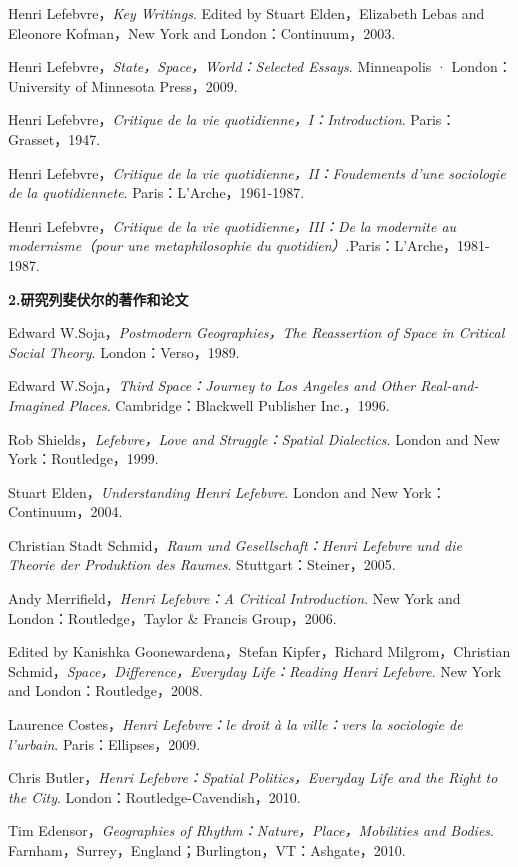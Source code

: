 \documentclass[UTF8, fontset = sourcesans, a4paper, oneside, zihao =
-4, scheme=chinese, no-math, space=true]{ctexbook}
\begin{document}
Henri Lefebvre，\emph{Key Writings}. Edited by Stuart Elden，Elizabeth
Lebas and Eleonore Kofman，New York and London：Continuum，2003.

Henri Lefebvre，\emph{State，Space，World：Selected Essays}. Minneapolis
· London：University of Minnesota Press，2009.

Henri Lefebvre，\emph{Critique de la vie quotidienne，I：Introduction}.
Paris：Grasset，1947.

Henri Lefebvre，\emph{Critique de la vie quotidienne，II：Foudements
d'une sociologie de la quotidiennete}. Paris：L'Arche，1961-1987.

Henri Lefebvre，\emph{Critique de la vie quotidienne，III：De la
modernite au modernisme（pour une metaphilosophie du
quotidien）}.Paris：L'Arche，1981-1987.

\textbf{2.研究列斐伏尔的著作和论文}

Edward W.Soja，\emph{Postmodern Geographies，The Reassertion of Space in
Critical Social Theory}. London：Verso，1989.

Edward W.Soja，\emph{Third Space：Journey to Los Angeles and Other
Real-and-Imagined Places}. Cambridge：Blackwell Publisher Inc.，1996.

Rob Shields，\emph{Lefebvre，Love and Struggle：Spatial Dialectics}.
London and New York：Routledge，1999.

Stuart Elden，\emph{Understanding Henri Lefebvre}. London and New
York：Continuum，2004.

Christian Stadt Schmid，\emph{Raum und Gesellschaft：Henri Lefebvre und
die Theorie der Produktion des Raumes}. Stuttgart：Steiner，2005.

Andy Merrifield，\emph{Henri Lefebvre：A Critical Introduction}. New
York and London：Routledge，Taylor \& Francis Group，2006.

Edited by Kanishka Goonewardena，Stefan Kipfer，Richard
Milgrom，Christian Schmid，\emph{Space，Difference，Everyday
Life：Reading Henri Lefebvre}. New York and London：Routledge，2008.

Laurence Costes，\emph{Henri Lefebvre：le droit à la ville：vers la
sociologie de l'urbain}. Paris：Ellipses，2009.

Chris Butler，\emph{Henri Lefebvre：Spatial Politics，Everyday Life and
the Right to the City}. London：Routledge-Cavendish，2010.

Tim Edensor，\emph{Geographies of Rhythm：Nature，Place，Mobilities and
Bodies}. Farnham，Surrey，England；Burlington，VT：Ashgate，2010.
\end{document}

